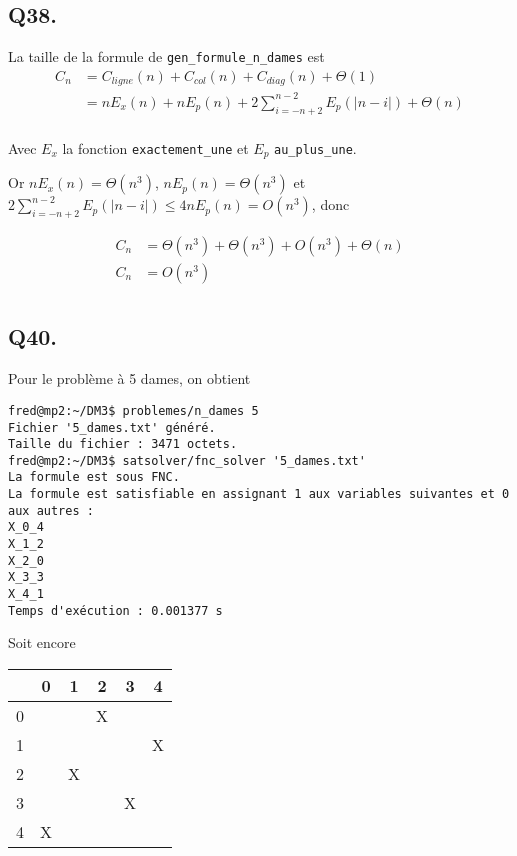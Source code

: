\subsection*{Q38.}
La taille de la formule de \verb|gen_formule_n_dames| est
\begin{align*}
    C_n &= C_{ligne}(n) + C_{col}(n) + C_{diag}(n) + \Theta(1)\\
    &= nE_x(n) + nE_p(n) + 2\sum_{i=-n+2}^{n-2}E_p(|n-i|) + \Theta(n)\\
\end{align*}

Avec $E_x$ la fonction \verb|exactement_une| et $E_p$ \verb|au_plus_une|.

Or $nE_x(n) = \Theta(n^3)$, $nE_p(n) = \Theta(n^3)$ et
$2\sum_{i=-n+2}^{n-2}E_p(|n-i|) \leq 4nE_p(n) = O(n^3)$, donc

\begin{align*}
    C_n &= \Theta(n^3) + \Theta(n^3) + O(n^3) +\Theta(n)\\
    C_n &= \boxed{O(n^3)}\\
\end{align*}

\subsection*{Q40.}
Pour le problème à 5 dames, on obtient

\begin{lstlisting}
fred@mp2:~/DM3$ problemes/n_dames 5
Fichier '5_dames.txt' généré.
Taille du fichier : 3471 octets.
fred@mp2:~/DM3$ satsolver/fnc_solver '5_dames.txt'
La formule est sous FNC.
La formule est satisfiable en assignant 1 aux variables suivantes et 0 aux autres :
X_0_4
X_1_2
X_2_0
X_3_3
X_4_1
Temps d'exécution : 0.001377 s
\end{lstlisting}

Soit encore
\begin{center}
    \begin{tabular}{| c || *{5}{c |}}
    \hline
      & 0 & 1 & 2 & 3 & 4 \\
    \hline
    \hline
    0 &   &   & X &   &   \\
    \hline
    1 &   &   &   &   & X \\
    \hline
    2 &   & X &   &   &   \\
    \hline
    3 &   &   &   & X &   \\
    \hline
    4 & X &   &   &   &   \\
    \hline
    \end{tabular}
\end{center}


